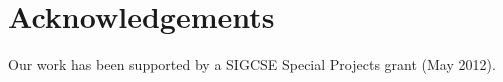 \documentclass{sig-alternate}
\begin{document}
%
%
%
%
%
%
%
%



  

\section{Acknowledgements}

Our work has been supported by a SIGCSE Special Projects grant (May 2012).
\end{document}
